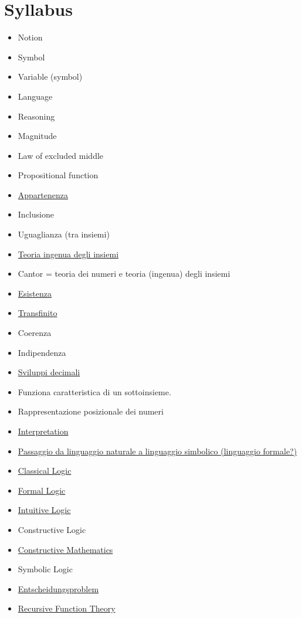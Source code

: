 \section{Syllabus}
\begin{itemize}
 \item Notion
 \item Symbol
 \item Variable (symbol)
 \item Language
 \item Reasoning
 \item Magnitude
 \item Law of excluded middle
 \item Propositional function
 \item \href{Appartenenza.html}{Appartenenza}
 \item Inclusione
 \item Uguaglianza (tra insiemi)
 \item \href{TeoriaIngenuaInsiemi.html}{Teoria ingenua degli insiemi}
 \item Cantor = teoria dei numeri e teoria (ingenua) degli insiemi
 \item \href{./Esistenza.html}{Esistenza}
 \item \href{./Transfinito.html}{Transfinito}
 \item Coerenza
 \item Indipendenza
 \item \href{./SviluppiDecimali.html}{Sviluppi decimali}
 \item Funziona caratteristica di un sottoinsieme.
 \item Rappresentazione posizionale dei numeri
 \item \href{./Interpretation.html}{Interpretation}
 \item \href{./Passaggio.html}{Passaggio da linguaggio naturale a linguaggio simbolico (linguaggio formale?)}
 \item \href{ClassicalLogic.html}{Classical Logic}
 \item \href{FormalLogic.html}{Formal Logic}
 \item \href{./IntuitiveLogic.html}{Intuitive Logic}
 \item Constructive Logic
 \item \href{ConstructiveMathematics.html}{Constructive Mathematics}
 \item Symbolic Logic
 \item \href{Entscheidungsproblem.html}{Entscheidungsproblem}
 \item \href{./RecursiveFunctionTheory.html}{Recursive Function Theory}
\end{itemize}



